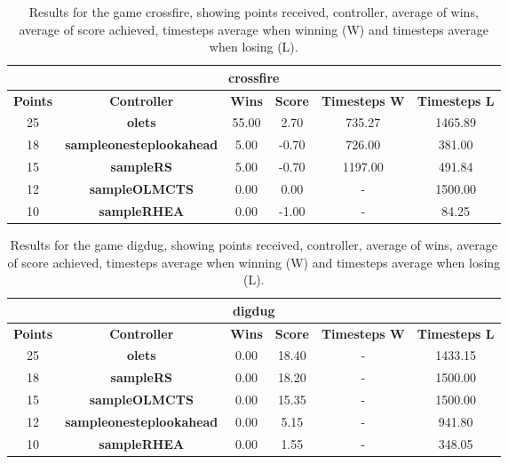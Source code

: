 \begin{table*}[!t]
\begin{center}
\begin{tabular}{|c|c|c|c|c|c|}
\multicolumn{6}{c}{\textbf{crossfire}}\\
\hline
\textbf{Points} & \textbf{Controller} & \textbf{Wins} &  \textbf{Score} & \textbf{Timesteps W} & \textbf{Timesteps L}\\
\hline
25 & \textbf{olets} & 55.00 & 2.70 & 735.27 & 1465.89
 \\
\hline
18 & \textbf{sampleonesteplookahead} & 5.00 & -0.70 & 726.00 & 381.00
 \\
\hline
15 & \textbf{sampleRS} & 5.00 & -0.70 & 1197.00 & 491.84
 \\
\hline
12 & \textbf{sampleOLMCTS} & 0.00 & 0.00 &  -  & 1500.00
 \\
\hline
10 & \textbf{sampleRHEA} & 0.00 & -1.00 &  -  & 84.25
 \\
\hline
\end{tabular}
\caption{Results for the game crossfire, showing points received, controller, average of wins, average of score achieved, timesteps average when winning (W) and timesteps average when losing (L).}
\label{tab:weights}
\end{center}
\end{table*}
\begin{table*}[!t]
\begin{center}
\begin{tabular}{|c|c|c|c|c|c|}
\multicolumn{6}{c}{\textbf{digdug}}\\
\hline
\textbf{Points} & \textbf{Controller} & \textbf{Wins} &  \textbf{Score} & \textbf{Timesteps W} & \textbf{Timesteps L}\\
\hline
25 & \textbf{olets} & 0.00 & 18.40 &  -  & 1433.15
 \\
\hline
18 & \textbf{sampleRS} & 0.00 & 18.20 &  -  & 1500.00
 \\
\hline
15 & \textbf{sampleOLMCTS} & 0.00 & 15.35 &  -  & 1500.00
 \\
\hline
12 & \textbf{sampleonesteplookahead} & 0.00 & 5.15 &  -  & 941.80
 \\
\hline
10 & \textbf{sampleRHEA} & 0.00 & 1.55 &  -  & 348.05
 \\
\hline
\end{tabular}
\caption{Results for the game digdug, showing points received, controller, average of wins, average of score achieved, timesteps average when winning (W) and timesteps average when losing (L).}
\label{tab:weights}
\end{center}
\end{table*}
